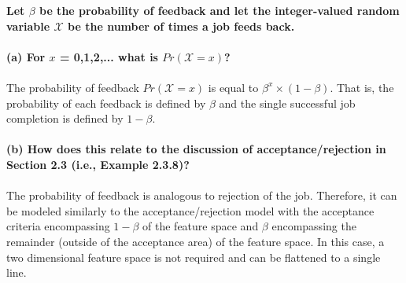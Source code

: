 \textbf{Let $\beta$ be the probability of feedback and let the integer-valued random variable $\mathcal{X}$ be the number of times a job feeds back.}\\\\

\noindent \textbf{(a) For $x$ = 0,1,2,... what is $Pr(\mathcal{X} = x)$?}\\\\

\noindent The probability of feedback $Pr(\mathcal{X} = x)$ is equal to $\beta^x \times (1 - \beta)$. That is, the probability of each feedback is defined by $\beta$ and the single successful job completion is defined by $1-\beta$.\\\\

\noindent \textbf{(b) How does this relate to the discussion of acceptance/rejection in Section 2.3 (i.e., Example 2.3.8)?}\\\\

\noindent The probability of feedback is analogous to rejection of the job. Therefore, it can be modeled similarly to the acceptance/rejection model with the acceptance criteria encompassing $1-\beta$ of the feature space and $\beta$ encompassing the remainder (outside of the acceptance area) of the feature space. In this case, a two dimensional feature space is not required and can be flattened to a single line.

\newpage
